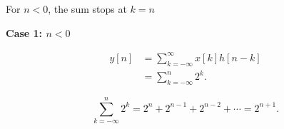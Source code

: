 \documentclass[aspectratio=169,11pt]{beamer}
\newcommand{\CardTitleSize}{\large}
\newcommand{\CardTitle}[1]{%
  \vspace{0.15cm}
  {\CardTitleSize\bfseries #1}\par
}
\begin{document}
\begin{frame}{For \(n<0\), the sum stops at \(k=n\)}

\begin{center}
\begin{BlueCard}[
  width=0.88\textwidth,
  halign=center,
  top=12pt,
  bottom=12pt
]
\CardTitle{Case 1: \(n<0\)}

\vspace{0.08cm}

\[
\begin{aligned}
y[n]
&=
\sum_{k=-\infty}^{\infty}x[k]h[n-k]\\[3pt]
&=
\sum_{k=-\infty}^{n}2^k.
\end{aligned}
\]

\vspace{0.10cm}

\[
\sum_{k=-\infty}^{n}2^k
=
2^n+2^{n-1}+2^{n-2}+\cdots
=
2^{n+1}.
\]



\end{BlueCard}
\end{center}

\end{frame}
\end{document}
